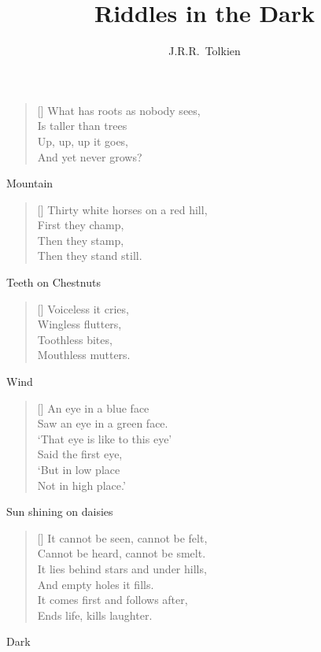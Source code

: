 \documentclass[grid,avery5371]{flashcards}
\title{Riddles in the Dark}
\author{J.R.R.~Tolkien}
\begin{document}
\begin{flashcard}[Gollum]{%
\begin{verse}[\versewidth]
What has roots as nobody sees,\\
Is taller than trees\\
\vin Up, up, up it goes,\\
\vin And yet never grows?
\end{verse}}
Mountain
\end{flashcard}

\begin{flashcard}[Bilbo]{%
\begin{verse}[\versewidth]
Thirty white horses on a red hill,\\
\vin First they champ,\\
\vin Then they stamp,\\
Then they stand still.
\end{verse}}
Teeth on Chestnuts
\end{flashcard}

\begin{flashcard}[Gollum]{%
\begin{verse}[\versewidth]
Voiceless it cries,\\
Wingless flutters,\\
Toothless bites,\\
Mouthless mutters.
\end{verse}}
Wind
\end{flashcard}

\begin{flashcard}[Bilbo]{%
\begin{verse}[\versewidth]
An eye in a blue face\\
Saw an eye in a green face.\\
`That eye is like to this eye'\\
Said the first eye,\\
`But in low place\\
Not in high place.'
\end{verse}}
Sun shining on daisies
\end{flashcard}

\begin{flashcard}[Gollum]{%
\begin{verse}[\versewidth]
It cannot be seen, cannot be felt,\\
Cannot be heard, cannot be smelt.\\
It lies behind stars and under hills,\\
\vin And empty holes it fills.\\
It comes first and follows after,\\
\vin Ends life, kills laughter.
\end{verse}}
Dark
\end{flashcard}
\end{document}
